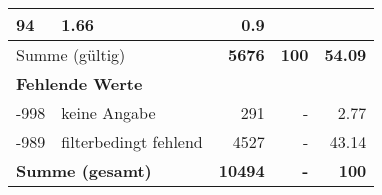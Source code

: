 \begin{longtable}{lXrrr}
       \num{94} &
       \num[round-mode=places,round-precision=2]{1.66} &
         \num[round-mode=places,round-precision=2]{0.9} \\
     \midrule
     \multicolumn{2}{l}{Summe (gültig)} &
       \textbf{\num{5676}} &
     \textbf{\num{100}} &
       \textbf{\num[round-mode=places,round-precision=2]{54.09}} \\
     \multicolumn{5}{l}{\textbf{Fehlende Werte}}\\
       -998 &
       keine Angabe &
         \num{291} &
        - &
         \num[round-mode=places,round-precision=2]{2.77} \\
       -989 &
       filterbedingt fehlend &
         \num{4527} &
        - &
         \num[round-mode=places,round-precision=2]{43.14} \\
     \midrule
     \multicolumn{2}{l}{\textbf{Summe (gesamt)}} &
          \textbf{\num{10494}} &
        \textbf{-} &
        \textbf{\num{100}} \\
     \bottomrule
     \end{longtable}
     
